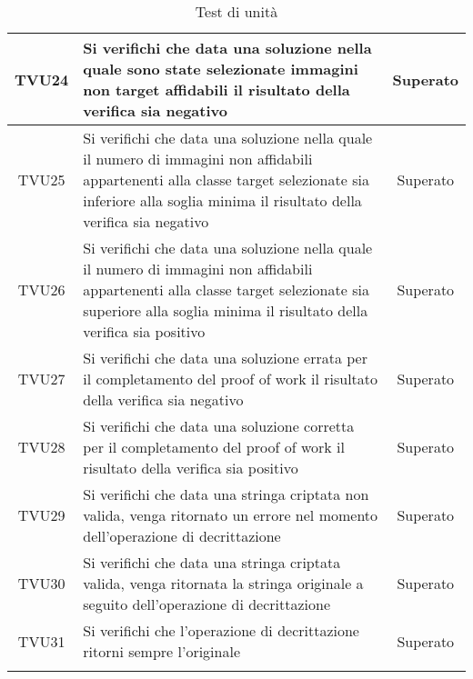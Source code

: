 \begin{center}
\begin{xltabular}{\textwidth}{|c|X|c|}
		\hline
		TVU24 & Si verifichi che data una soluzione nella quale sono state selezionate immagini non target affidabili il risultato della verifica sia negativo & Superato\\
		\hline
		TVU25 & Si verifichi che data una soluzione nella quale il numero di immagini non affidabili appartenenti alla classe target selezionate sia inferiore alla soglia minima il risultato della verifica sia negativo & Superato\\
		\hline
		TVU26 & Si verifichi che data una soluzione nella quale il numero di immagini non affidabili appartenenti alla classe target selezionate sia superiore alla soglia minima il risultato della verifica sia positivo & Superato\\
		\hline
		TVU27 & Si verifichi che data una soluzione errata per il completamento del proof of work il risultato della verifica sia negativo & Superato\\
		\hline
		TVU28 & Si verifichi che data una soluzione corretta per il completamento del proof of work il risultato della verifica sia positivo & Superato\\
		\hline
		TVU29 & Si verifichi che data una stringa criptata non valida, venga ritornato un errore nel momento dell'operazione di decrittazione & Superato\\
		\hline
		TVU30 & Si verifichi che data una stringa criptata valida, venga ritornata la stringa originale a seguito dell'operazione di decrittazione & Superato\\
		\hline
		TVU31 & Si verifichi che l'operazione di decrittazione ritorni sempre l'originale & Superato\\
		\hline
		\caption{Test di unità}
	\end{xltabular}
\end{center}


